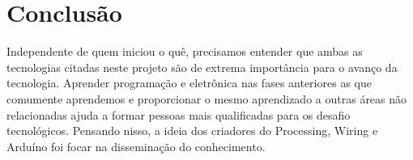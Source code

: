 \chapter{Conclusão}

Independente de quem iniciou o quê, precisamos entender que ambas as tecnologias citadas neste projeto são de extrema importância para o avanço da tecnologia. Aprender programação e eletrônica nas fases anteriores as que comumente aprendemos e proporcionar o mesmo aprendizado a outras áreas não relacionadas ajuda a formar pessoas mais qualificadas para os desafio tecnológicos. Pensando nisso, a ideia dos criadores do Processing, Wiring e Arduíno foi focar na disseminação do conhecimento.